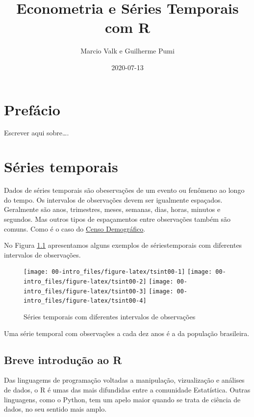 \documentclass[
]{book}
\title{Econometria e Séries Temporais com R}
\author{Marcio Valk e Guilherme Pumi}
\date{2020-07-13}
\theoremstyle{definition}
\theoremstyle{definition}
\theoremstyle{definition}
\theoremstyle{remark}
\begin{document}
\maketitle

{
\setcounter{tocdepth}{1}
\tableofcontents
}
\hypertarget{prefuxe1cio}{%
\chapter*{Prefácio}\label{prefuxe1cio}}

Escrever aqui sobre\ldots.

\hypertarget{suxe9ries-temporais}{%
\chapter{Séries temporais}\label{suxe9ries-temporais}}

Dados de séries temporais são obeservações de um evento ou fenômeno ao longo do tempo. Os intervalos de observações devem ser igualmente espaçados. Geralmente são anos, trimestres, meses, semanas, dias, horas, minutos e segundos. Mas outros tipos de espaçamentos entre observações também são comuns. Como é o caso do \href{https://www.ibge.gov.br/estatisticas/sociais/populacao/22827-censo-2020-censo4.html}{Censo Demográfico}.

No Figura \ref{fig:tsint00} apresentamos alguns exemplos de sériestemporais com diferentes intervalos de observações.

\begin{figure}

{\centering \texttt{[image: 00-intro\_files/figure-latex/tsint00-1]} \texttt{[image: 00-intro\_files/figure-latex/tsint00-2]} \texttt{[image: 00-intro\_files/figure-latex/tsint00-3]} \texttt{[image: 00-intro\_files/figure-latex/tsint00-4]} 

}

\caption{Séries temporais com diferentes intervalos de observações}\label{fig:tsint00}
\end{figure}

Uma série temporal com observações a cada dez anos é a da população brasileira.

\hypertarget{intro}{%
\section{Breve introdução ao R}\label{intro}}

Das linguagems de programação voltadas a manipulação, vizualização e análises de dados, o R é umas das mais difundidas entre a comunidade Estatística. Outras linguagens, como o Python, tem um apelo maior quando se trata de ciência de dados, no seu sentido mais amplo.
\end{document}
